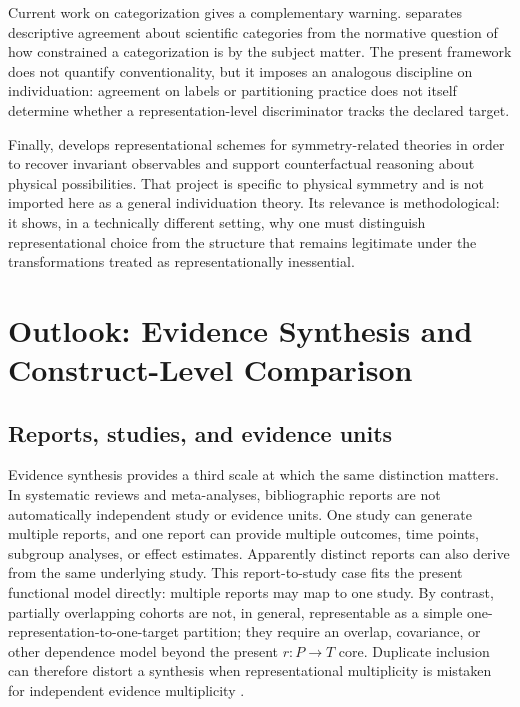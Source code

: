 \documentclass[11pt]{article}
\begin{document}
Current work on categorization gives a complementary warning. \citet{Runhardt2025Categorization} separates descriptive agreement about scientific categories from the normative question of how constrained a categorization is by the subject matter. The present framework does not quantify conventionality, but it imposes an analogous discipline on individuation: agreement on labels or partitioning practice does not itself determine whether a representation-level discriminator tracks the declared target.

Finally, \citet{Gomes2025Schemes} develops representational schemes for symmetry-related theories in order to recover invariant observables and support counterfactual reasoning about physical possibilities. That project is specific to physical symmetry and is not imported here as a general individuation theory. Its relevance is methodological: it shows, in a technically different setting, why one must distinguish representational choice from the structure that remains legitimate under the transformations treated as representationally inessential.

\section{Outlook: Evidence Synthesis and Construct-Level Comparison}

\subsection{Reports, studies, and evidence units}

Evidence synthesis provides a third scale at which the same distinction matters. In systematic reviews and meta-analyses, bibliographic reports are not automatically independent study or evidence units. One study can generate multiple reports, and one report can provide multiple outcomes, time points, subgroup analyses, or effect estimates. Apparently distinct reports can also derive from the same underlying study. This report-to-study case fits the present functional model directly: multiple reports may map to one study. By contrast, partially overlapping cohorts are not, in general, representable as a simple one-representation-to-one-target partition; they require an overlap, covariance, or other dependence model beyond the present \(r:P\to T\) core. Duplicate inclusion can therefore distort a synthesis when representational multiplicity is mistaken for independent evidence multiplicity \citep{Tramer1997DuplicateMetaAnalysis,VonElm2004DuplicatePublication}.
\end{document}
